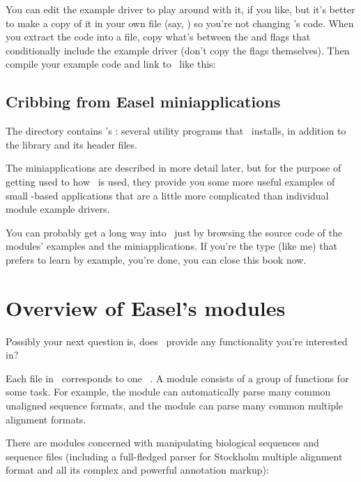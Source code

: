 You can edit the example driver to play around with it, if you like,
but it's better to make a copy of it in your own file (say,
) so you're not changing \Easel's code. When you
extract the code into a file, copy what's between the  and  flags that
conditionally include the example driver (don't copy the flags
themselves). Then compile your example code and link to \Easel\ like
this:

\begin{cchunk}
\end{cchunk}

\subsection{Cribbing from Easel miniapplications}

The  directory contains \Easel's
: several utility programs that \Easel\
installs, in addition to the library  and its header
files.

The miniapplications are described in more detail later, but for the
purpose of getting used to how \Easel\ is used, they provide you some
more useful examples of small \Easel-based applications that are a
little more complicated than individual module example drivers.

You can probably get a long way into \Easel\ just by browsing the
source code of the modules' examples and the miniapplications. If
you're the type (like me) that prefers to learn by example, you're
done, you can close this book now. 



\section{Overview of Easel's modules}

Possibly your next question is, does \Easel\ provide any functionality
you're interested in?

Each  file in \Easel\ corresponds to one \Easel\
.  A module consists of a group of functions for some
task. For example, the \eslmod{sqio} module can automatically parse
many common unaligned sequence formats, and the \eslmod{msa} module
can parse many common multiple alignment formats.

There are modules concerned with manipulating biological sequences and
sequence files (including a full-fledged parser for Stockholm multiple
alignment format and all its complex and powerful annotation markup):

